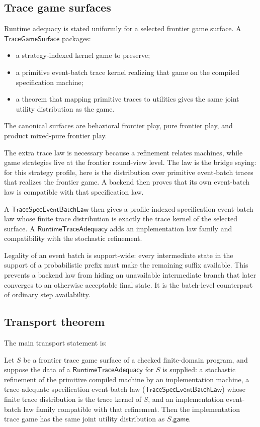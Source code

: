 \subsection{Trace game surfaces}
\label{sec:ref:trace-surfaces}

Runtime adequacy is stated uniformly for a selected frontier game
surface.  A \(\mathsf{TraceGameSurface}\) packages:
\begin{itemize}\itemsep1pt
\item a strategy-indexed kernel game to preserve;
\item a primitive event-batch trace kernel realizing that game on the
  compiled specification machine;
\item a theorem that mapping primitive traces to utilities gives the same
  joint utility distribution as the game.
\end{itemize}
The canonical surfaces are behavioral frontier play, pure frontier play,
and product mixed-pure frontier play.

The extra trace law is necessary because a refinement relates machines,
while game strategies live at the frontier round-view level.  The law is
the bridge saying: for this strategy profile, here is the distribution
over primitive event-batch traces that realizes the frontier game.  A
backend then proves that its own event-batch law is compatible with that
specification law.

A \(\mathsf{TraceSpecEventBatchLaw}\) then gives a profile-indexed
specification event-batch law whose finite trace distribution is exactly
the trace kernel of the selected surface.  A
\(\mathsf{RuntimeTraceAdequacy}\) adds an implementation law family and
compatibility with the stochastic refinement.

Legality of an event batch is support-wide: every intermediate state in
the support of a probabilistic prefix must make the remaining suffix
available.  This prevents a backend law from hiding an unavailable
intermediate branch that later converges to an otherwise acceptable final
state.  It is the batch-level counterpart of ordinary step availability.

\subsection{Transport theorem}
\label{sec:ref:transport}

The main transport statement is:
\begin{theorem}
\label{thm:runtime-trace}
Let \(S\) be a frontier trace game surface of a checked finite-domain
program, and suppose the data of a \(\mathsf{RuntimeTraceAdequacy}\) for
\(S\) is supplied: a stochastic refinement of the primitive compiled machine
by an implementation machine, a trace-adequate specification event-batch law
(\(\mathsf{TraceSpecEventBatchLaw}\)) whose finite trace distribution is the
trace kernel of \(S\), and an implementation event-batch law family
compatible with that refinement.  Then the implementation trace game has the
same joint utility distribution as \(S.\mathsf{game}\).
\end{theorem}

